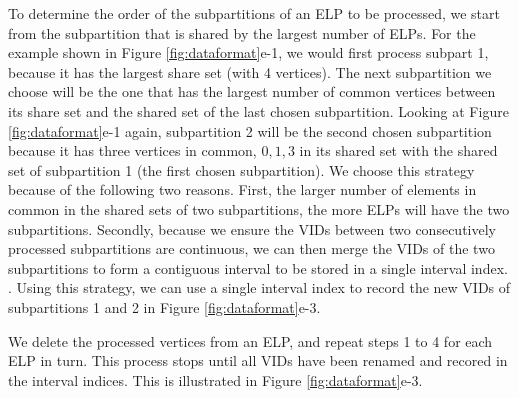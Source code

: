  To determine the order of the subpartitions of an ELP to be processed, we start from the
subpartition that is shared by the largest number of ELPs.  For the example shown in Figure \ref{fig:dataformat}e-1, we would first process
subpart 1, because it has the largest share set (with 4 vertices).  The next subpartition we choose will be the one that has the largest
number of common vertices between its share set and the shared set of the last chosen subpartition. Looking at Figure
\ref{fig:dataformat}e-1 again, subpartition 2 will be the second chosen subpartition because it has three vertices in common, $0, 1, 3$ in
its shared set with the shared set of subpartition 1 (the first chosen subpartition). We choose this strategy because of the following two
reasons. First, the larger number of elements in common in the shared sets of two subpartitions, the more ELPs will have the two
subpartitions. Secondly, because we ensure the VIDs between two consecutively processed subpartitions are continuous, we can then merge the
VIDs of the two subpartitions to form a contiguous interval to be stored in a single interval index. . Using this strategy, we can use a
single interval index to record the new VIDs of subpartitions 1 and 2 in Figure \ref{fig:dataformat}e-3.


 We delete the processed vertices from an ELP, and repeat steps 1 to 4 for each ELP in turn. This
process stops until all VIDs have been renamed and recored in the interval indices. This is illustrated in Figure \ref{fig:dataformat}e-3.



